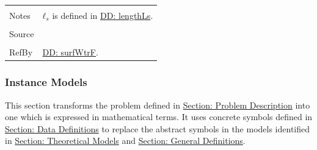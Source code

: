\documentclass[12pt]{article}
\begin{document}
\begin{minipage}{\textwidth}
\begin{tabular}{p{} p{}}
                                                  \\ \midrule \\
                                                  Notes & ${ℓ_{s}}$ is defined in \hyperref[DD:lengthLs]{DD: lengthLs}.
                                                          \\ \midrule \\
                                                          Source & \cite{fredlund1977}
                                                                   \\ \midrule \\
                                                                   RefBy & \hyperref[DD:surfWtrF]{DD: surfWtrF}.
\\ \bottomrule \end{tabular}
\end{minipage}
\subsubsection{Instance Models}
\label{Sec:IMs}
This section transforms the problem defined in \hyperref[Sec:ProbDesc]{Section: Problem Description} into one which is expressed in mathematical terms. It uses concrete symbols defined in \hyperref[Sec:DDs]{Section: Data Definitions} to replace the abstract symbols in the models identified in \hyperref[Sec:TMs]{Section: Theoretical Models} and \hyperref[Sec:GDs]{Section: General Definitions}.
\par~
\end{document}

